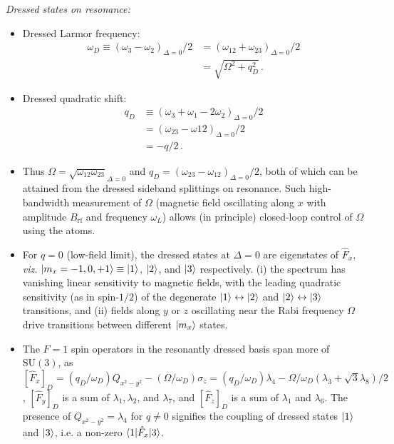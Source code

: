 \documentclass[aps,prl,reprint,superscriptaddress,floatfix]{revtex4-1}
\begin{document}
\textit{Dressed states on resonance:}
\begin{itemize}
    \item Dressed Larmor frequency:
    \begin{align*}
        \omega_D \equiv (\omega_3 - \omega_2)_{\Delta=0}/2 &= (\omega_{12} + \omega_{23})_{\Delta=0}/2 \\ &= \sqrt{\Omega^2 + q_D^2}\, .
    \end{align*}
    \item Dressed quadratic shift:
    \begin{align*}
        q_D &\equiv (\omega_3 + \omega_1 -2\omega_2)_{\Delta=0}/2 \\
            &= (\omega_{23}-\omega{12})_{\Delta=0}/2\\ 
            &= -q/2 \, .
     \end{align*}
    \item Thus $\Omega = \sqrt{\omega_{12} \omega_{23}}_{\Delta=0}$ and $q_D = (\omega_{23} - \omega_{12})_{\Delta=0}/2$, both of which can be attained from the dressed sideband splittings on resonance.
    Such high-bandwidth measurement of $\Omega$ (magnetic field oscillating along $x$ with amplitude $B_{\text{rf}}$ and frequency $\omega_L$) allows (in principle) closed-loop control of $\Omega$ using the atoms.
    \item For $q=0$ (low-field limit), the dressed states at $\Delta=0$ are eigenstates of $\hat{F}_x$, \textit{viz.} $\vert m_x=-1,0,+1 \rangle  \equiv \vert 1 \rangle $, $\vert 2 \rangle $, and $\vert 3 \rangle $ respectively.
    (i) the spectrum has vanishing linear sensitivity to magnetic fields, with the leading quadratic sensitivity (as in spin-$1/2$) of the degenerate $\vert 1 \rangle  \leftrightarrow \vert 2 \rangle $ and $\vert 2 \rangle  \leftrightarrow \vert 3 \rangle $ transitions, and (ii) fields along $y$ or $z$ oscillating near the Rabi frequency $\Omega$ drive transitions between different $\vert m_x \rangle $ states. 
    \item The $F=1$ spin operators in the resonantly dressed basis span more of $\text{SU}(3)$, as $[\hat{F}_x]_D = (q_D/\omega_D) Q_{x^2-y^2} - (\Omega / \omega_D) \sigma_z = (q_D/\omega_D) \lambda_4 - \Omega / \omega_D ( \lambda_3 +\sqrt{3} \lambda_8) / 2$, $[\hat{F}_y]_D$ is a sum of $\lambda_1, \lambda_2$, and $\lambda_7$, and  $[\hat{F}_z]_D$ is a sum of $\lambda_1$ and $\lambda_6$.
    The presence of $Q_{x^2-y^2} = \lambda_4$ for $q \neq 0$ signifies the coupling of dressed states $\vert 1 \rangle $ and $\vert 3 \rangle $, i.e. a non-zero $\langle 1 \vert  \hat{F}_x \vert 3 \rangle $.

\end{itemize}
\end{document}

